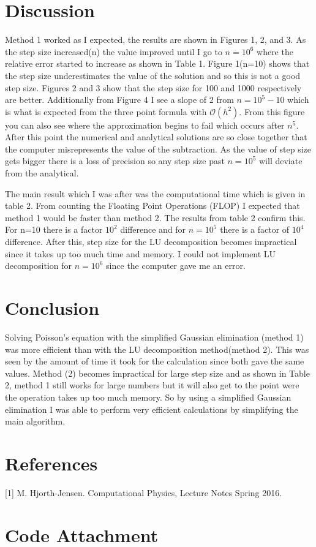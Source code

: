 \documentclass[11pt,a4wide]{article}
\begin{document}
\section{Discussion}
Method 1 worked as I expected, the results are shown in Figures 1, 2, and 3. As the step size increased(n) the value improved until 
I go to $n=10^6$ where the relative error started to increase as shown in Table 1. Figure 1(n=10) shows that the step size underestimates the value of the solution and so this is not a good step size. Figures 2 and 3 show that the step size for 100 and 1000 respectively are better. Additionally from Figure 4 I see a slope of 2 from $n=10^5-10$ which is what is expected from the three point formula with $\mathcal{O}(h^2)$. From this figure you can also see where the approximation begins to fail which occurs after $n^5$. After this point the numerical and analytical solutions are so close together that the computer misrepresents the value of the subtraction. As the value of step size gets bigger there is a loss of precision so any step size past $n=10^5$ will deviate from the analytical. 

The main result which I was after was the computational time which is given in table 2. From counting the Floating Point Operations (FLOP) I expected that method 1 would be faster than method 2. The results from table 2 confirm this. For n=10 there is a factor $10^2 $ difference and for $n=10^5$ there is a factor of $10^4$ difference. After this, step size for the LU decomposition becomes impractical since it takes up too much time and memory. I could not implement LU decomposition for $n=10^6$ since the computer gave me an error.

\section{Conclusion}
Solving Poisson's equation with the simplified Gaussian elimination (method 1) was more efficient than with the LU decomposition method(method 2). This was seen by the amount of time it took for the calculation since both gave the same values. Method (2) becomes impractical for large step size and as shown in Table 2, method 1 still works for large numbers but it will also get to the point were the operation takes up too much memory. So by using a simplified Gaussian elimination I was able to perform very efficient calculations by simplifying the main algorithm.

\section{References}
[1] M. Hjorth-Jensen. Computational Physics, Lecture Notes Spring 2016. 

\section{Code Attachment}

\end{document}
